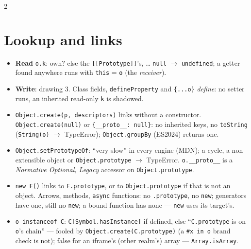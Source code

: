 \documentclass[8pt]{extarticle}
\newcommand\ct[1]{\texttt{#1}}
\begin{document}
\begin{multicols}{2}
\raggedright
\footnotesize{}

\section{Lookup and links}
\begin{itemize}\raggedright
  \item \textbf{Read} \ct{o.k}: own? else the \ct{[[Prototype]]}'s, \ldots{} \ct{null} $\to$
        \ct{undefined}; a getter found anywhere runs with \ct{this} = \ct{o} (the
        \emph{receiver}).
  \item \textbf{Write}: drawing 3. Class fields, \ct{defineProperty} and \ct{\{...o\}}
        \emph{define}: no setter runs, an inherited read-only \ct{k} is shadowed.
  \item \ct{Object.create(p, descriptors)} links without a constructor. \ct{Object.create(null)}
        or \ct{\{\_\_proto\_\_: null\}}: no inherited keys, no \ct{toString} (\ct{String(o)}
        $\to$ TypeError); \ct{Object.groupBy} (ES2024) returns one.
  \item \ct{Object.setPrototypeOf}: ``very slow'' in every engine (MDN); a cycle, a
        non-extensible object or \ct{Object.prototype} $\to$ TypeError. \ct{o.\_\_proto\_\_} is
        a \emph{Normative Optional, Legacy} accessor on \ct{Object.prototype}.
  \item \ct{new F()} links to \ct{F.prototype}, or to \ct{Object.prototype} if that is not an
        object. Arrows, methods, \ct{async} functions: no \ct{.prototype}, no \ct{new};
        generators have one, still no \ct{new}; a bound function has none — \ct{new} uses
        its target's.
  \item \ct{o instanceof C}: \ct{C[Symbol.hasInstance]} if defined, else ``\ct{C.prototype} is on
        \ct{o}'s chain'' — fooled by \ct{Object.create(C.prototype)} (a \ct{\#x in o} brand
        check is not); false for an iframe's (other realm's) array — \ct{Array.isArray}.
\end{itemize}


\end{multicols}
\end{document}
